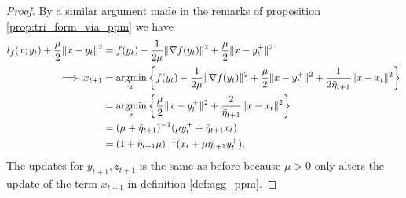 \documentclass[12pt]{article}
\begin{document}
            \begin{proof}
                By a similar argument made in the remarks of \hyperref[prop:tri_form_via_ppm]{proposition \ref*{prop:tri_form_via_ppm}} we have 
                \begin{align*}
                    l_f(x; y_t) + \frac{\mu}{2}\Vert x - y_t\Vert^2
                    &= 
                    f(y_t) - \frac{1}{2\mu}\Vert \nabla f(y_t)\Vert^2 + \frac{\mu}{2}\Vert x - y_t^+\Vert^2
                    \\
                    \implies 
                    x_{t + 1} &= 
                    \mathop{\rm argmin}\limits_{x} 
                    \left\lbrace
                        f(y_t) - \frac{1}{2\mu}\Vert \nabla f(y_t)\Vert^2 + \frac{\mu}{2}\Vert x - y_t^+\Vert^2
                        + 
                        \frac{1}{2\tilde \eta_{t + 1}} \Vert x - x_t\Vert^2
                    \right\rbrace
                    \\
                    &= 
                    \mathop{\rm argmin}\limits_{x}
                    \left\lbrace
                        \frac{\mu}{2}\Vert x - y_t^+\Vert^2 + 
                        \frac{2}{\tilde \eta_{t + 1}} \Vert x - x_t\Vert^2
                    \right\rbrace
                    \\
                    &= (\mu + \tilde \eta_{t + 1})^{-1}
                    (\mu y_t^+ + \tilde \eta_{t + 1}x_t)
                    \\
                    &= (1 + \tilde \eta_{t + 1}\mu)^{-1}
                    (x_t + \mu\tilde \eta_{t + 1}y_t^+). 
                \end{align*}
                The updates for $y_{t + 1}, z_{t + 1}$ is the same as before because $\mu > 0$ only alters the update of the term $x_{t + 1}$ in \hyperref[def:agg_ppm]{definition \ref*{def:agg_ppm}}. 
            \end{proof}
            
\end{document}
